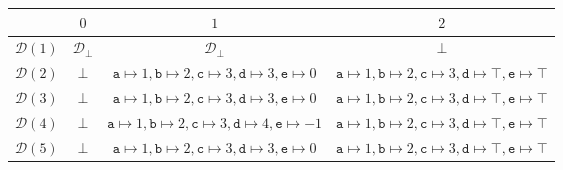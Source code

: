 \begin{table}[H]
    \centering
    \begin{subtable}{\linewidth}
        \centering
        \begin{tabular}{|c|c|c|c|}
            \hline
            & $0$ 
            & $1$ 
            & $2$ \\ \hline
            $\mathcal{D}(1)$ 
            & $\mathcal{D}_\bot$ 
            & $\mathcal{D}_\bot$ 
            & $\bot$ \\
            \hline
            $\mathcal{D}(2)$ 
            & $\bot$ 
            & $\texttt{a} \mapsto 1, \texttt{b} \mapsto 2, \texttt{c} \mapsto 3, \texttt{d} \mapsto 3, \texttt{e} \mapsto 0$ 
            & $\texttt{a} \mapsto 1, \texttt{b} \mapsto 2, \texttt{c} \mapsto 3, \texttt{d} \mapsto \top, \texttt{e} \mapsto \top$ \\
            \hline
            $\mathcal{D}(3)$ 
            & $\bot$ 
            & $\texttt{a} \mapsto 1, \texttt{b} \mapsto 2, \texttt{c} \mapsto 3, \texttt{d} \mapsto 3, \texttt{e} \mapsto 0$ 
            & $\texttt{a} \mapsto 1, \texttt{b} \mapsto 2, \texttt{c} \mapsto 3, \texttt{d} \mapsto \top, \texttt{e} \mapsto \top$ \\
            \hline
            $\mathcal{D}(4)$ 
            & $\bot$ 
            & $\texttt{a} \mapsto 1, \texttt{b} \mapsto 2, \texttt{c} \mapsto 3, \texttt{d} \mapsto 4, \texttt{e} \mapsto -1$ 
            & $\texttt{a} \mapsto 1, \texttt{b} \mapsto 2, \texttt{c} \mapsto 3, \texttt{d} \mapsto \top, \texttt{e} \mapsto \top$ \\
            \hline
            $\mathcal{D}(5)$ 
            & $\bot$ 
            & $\texttt{a} \mapsto 1, \texttt{b} \mapsto 2, \texttt{c} \mapsto 3, \texttt{d} \mapsto 3, \texttt{e} \mapsto 0$ 
            & $\texttt{a} \mapsto 1, \texttt{b} \mapsto 2, \texttt{c} \mapsto 3, \texttt{d} \mapsto \top, \texttt{e} \mapsto \top$ \\
            \hline
        \end{tabular}
    \end{subtable}
    
    \vspace{1cm}
    

\end{table}
